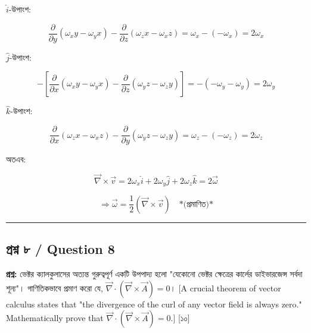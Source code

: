 \documentclass[11pt, a4paper]{article}
\begin{document}
$\hat{i}$-উপাংশ:

$$\frac{\partial}{\partial y}(\omega_x y - \omega_y x) - \frac{\partial}{\partial z}(\omega_z x - \omega_x z) = \omega_x - (-\omega_x) = 2\omega_x$$

$\hat{j}$-উপাংশ:

$$-\left[\frac{\partial}{\partial x}(\omega_x y - \omega_y x) - \frac{\partial}{\partial z}(\omega_y z - \omega_z y)\right] = -(-\omega_y - \omega_y) = 2\omega_y$$

$\hat{k}$-উপাংশ:

$$\frac{\partial}{\partial x}(\omega_z x - \omega_x z) - \frac{\partial}{\partial y}(\omega_y z - \omega_z y) = \omega_z - (-\omega_z) = 2\omega_z$$

অতএব:

$$\vec{\nabla} \times \vec{v} = 2\omega_x\hat{i} + 2\omega_y\hat{j} + 2\omega_z\hat{k} = 2\vec{\omega}$$

$$\Rightarrow \vec{\omega} = \frac{1}{2}(\vec{\nabla} \times \vec{v}) \quad \text{*(প্রমাণিত)*}$$

\vspace{1em}
\begin{center}
\end{center}

\vspace{1em}
\noindent\rule{\textwidth}{0.4pt}
\vspace{1em}

\subsection*{প্রশ্ন ৮ / Question 8}
\textbf{প্রশ্ন:} ভেক্টর ক্যালকুলাসের অত্যন্ত গুরুত্বপূর্ণ একটি উপপাদ্য হলো "যেকোনো ভেক্টর ক্ষেত্রের কার্লের ডাইভারজেন্স সর্বদা শূন্য"। গাণিতিকভাবে প্রমাণ করো যে, $\vec{\nabla} \cdot (\vec{\nabla} \times \vec{A}) = 0$। [A crucial theorem of vector calculus states that "the divergence of the curl of any vector field is always zero." Mathematically prove that $\vec{\nabla} \cdot (\vec{\nabla} \times \vec{A}) = 0$.] [১০]
\end{document}
